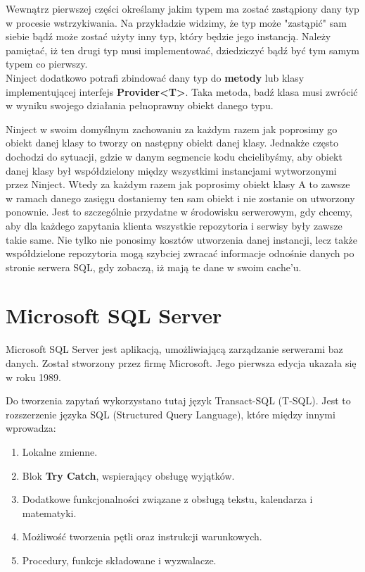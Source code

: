 Wewnątrz pierwszej części określamy jakim typem ma zostać zastąpiony dany typ w procesie wstrzykiwania. Na przykładzie widzimy, że typ może "zastąpić" sam siebie bądź może zostać użyty inny typ, który będzie jego instancją. Należy pamiętać, iż ten drugi typ musi implementować, dziedziczyć bądź być tym samym typem co pierwszy.
\\
Ninject dodatkowo potrafi zbindować dany typ do \textbf{metody} lub klasy implementującej interfejs \textbf{Provider<T>}. Taka metoda, badź klasa musi zwrócić w wyniku swojego działania pełnoprawny obiekt danego typu.


Ninject w swoim domyślnym zachowaniu za każdym razem jak poprosimy go obiekt danej klasy to tworzy on następny obiekt danej klasy. Jednakże często dochodzi do sytuacji, gdzie w danym segmencie kodu chcielibyśmy, aby obiekt danej klasy był współdzielony między wszystkimi instancjami wytworzonymi przez Ninject. Wtedy za każdym razem jak poprosimy obiekt klasy A to zawsze w ramach danego zasięgu dostaniemy ten sam obiekt i nie zostanie on utworzony ponownie.
Jest to szczególnie przydatne w środowisku serwerowym, gdy chcemy, aby dla każdego zapytania klienta wszystkie repozytoria i serwisy były zawsze takie same. Nie tylko nie ponosimy kosztów utworzenia danej instancji, lecz także współdzielone repozytoria mogą szybciej zwracać informacje odnośnie danych po stronie serwera SQL, gdy zobaczą, iż mają te dane w swoim cache'u.

\newpage
{\let\cleardoublepage\relax \chapter{Microsoft SQL Server}}

Microsoft SQL Server\cite{SqlServer} jest aplikacją, umożliwiającą zarządzanie serwerami baz danych. Został stworzony przez firmę Microsoft. Jego pierwsza edycja ukazała się w roku 1989.

Do tworzenia zapytań wykorzystano tutaj język Transact-SQL (T-SQL). Jest to rozszerzenie języka SQL (Structured Query Language), które między innymi wprowadza:

\begin{enumerate}
	\item Lokalne zmienne.
	\item Blok \textbf{Try Catch}, wspierający obsługę wyjątków.
	\item Dodatkowe funkcjonalności związane z obsługą tekstu, kalendarza i matematyki.
	\item Możliwość tworzenia pętli oraz instrukcji warunkowych.
	\item Procedury, funkcje składowane i wyzwalacze.
\end{enumerate} 

